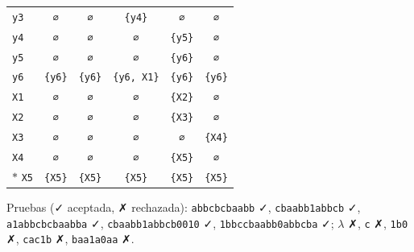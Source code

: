 \documentclass[11pt]{article}
\begin{document}
\begin{center}
\begin{tabular}{lccccc}
 \texttt{y3} & \texttt{∅} & \texttt{∅} & \texttt{\{y4\}} & \texttt{∅} & \texttt{∅} \\
 \texttt{y4} & \texttt{∅} & \texttt{∅} & \texttt{∅} & \texttt{\{y5\}} & \texttt{∅} \\
 \texttt{y5} & \texttt{∅} & \texttt{∅} & \texttt{∅} & \texttt{\{y6\}} & \texttt{∅} \\
 \texttt{y6} & \texttt{\{y6\}} & \texttt{\{y6\}} & \texttt{\{y6, X1\}} & \texttt{\{y6\}} & \texttt{\{y6\}} \\
 \texttt{X1} & \texttt{∅} & \texttt{∅} & \texttt{∅} & \texttt{\{X2\}} & \texttt{∅} \\
 \texttt{X2} & \texttt{∅} & \texttt{∅} & \texttt{∅} & \texttt{\{X3\}} & \texttt{∅} \\
 \texttt{X3} & \texttt{∅} & \texttt{∅} & \texttt{∅} & \texttt{∅} & \texttt{\{X4\}} \\
 \texttt{X4} & \texttt{∅} & \texttt{∅} & \texttt{∅} & \texttt{\{X5\}} & \texttt{∅} \\
$*$ \texttt{X5} & \texttt{\{X5\}} & \texttt{\{X5\}} & \texttt{\{X5\}} & \texttt{\{X5\}} & \texttt{\{X5\}} \\
\bottomrule\end{tabular}\end{center}
Pruebas (✓ aceptada, ✗ rechazada): \texttt{abbcbcbaabb} ✓, \texttt{cbaabb1abbcb} ✓, \texttt{a1abbcbcbaabba} ✓, \texttt{cbaabb1abbcb0010} ✓, \texttt{1bbccbaabb0abbcba} ✓; $\lambda$ ✗, \texttt{c} ✗, \texttt{1b0} ✗, \texttt{cac1b} ✗, \texttt{baa1a0aa} ✗.
\end{document}

